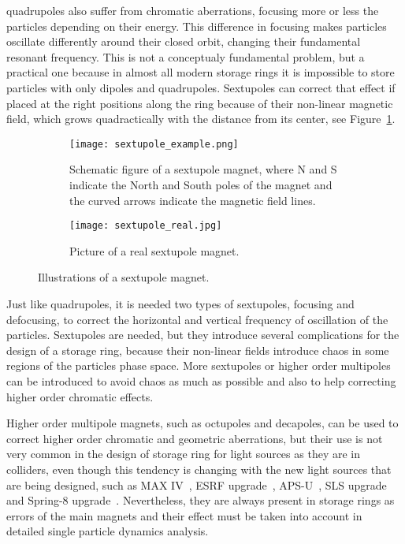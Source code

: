 \begin{description}[align=left]
        \item[Sextupoles:] quadrupoles also suffer from chromatic aberrations, focusing more or less the particles depending on their energy. This difference in focusing makes particles oscillate differently around their closed orbit, changing their fundamental resonant frequency. This is not a conceptualy fundamental problem, but a practical one because in almost all modern storage rings it is impossible to store particles with only dipoles and quadrupoles. Sextupoles can correct that effect if placed at the right positions along the ring because of their non-linear magnetic field, which grows quadractically with the distance from its center, see Figure~\ref{fig:sextupole}.
        \begin{figure}
            \centering
            \begin{subfigure}[c]{0.47\textwidth}
                \centering
                \texttt{[image: sextupole\_example.png]}
                \caption{Schematic figure of a sextupole magnet, where N and S indicate the North and South poles of the magnet and the curved arrows indicate the magnetic field lines.}
            \end{subfigure}\hfill
            \begin{subfigure}[c]{0.5\textwidth}
                \texttt{[image: sextupole\_real.jpg]}
                \caption{Picture of a real sextupole magnet.}
            \end{subfigure}
            \caption{Illustrations of a sextupole magnet.}
            \label{fig:sextupole}
        \end{figure}
        Just like quadrupoles, it is needed two types of sextupoles, focusing and defocusing, to correct the horizontal and vertical frequency of oscillation of the particles. Sextupoles are needed, but they introduce several complications for the design of a storage ring, because their non-linear fields introduce chaos in some regions of the particles phase space. More sextupoles or higher order multipoles can be introduced to avoid chaos as much as possible and also to help correcting higher order chromatic effects.
    \end{description}

    Higher order multipole magnets, such as octupoles and decapoles, can be used to correct higher order chromatic and geometric aberrations, but their use is not very common in the design of storage ring for light sources as they are in colliders, even though this tendency is changing with the new light sources that are being designed, such as MAX IV~\cite{Leemann2009}, ESRF upgrade~\cite{Farvacque2013}, APS-U~\cite{Sun2013}, SLS upgrade~\cite{Soutome2016} and Spring-8 upgrade~\cite{Soutome2016}. Nevertheless, they are always present in storage rings as errors of the main magnets and their effect must be taken into account in detailed single particle dynamics analysis.

